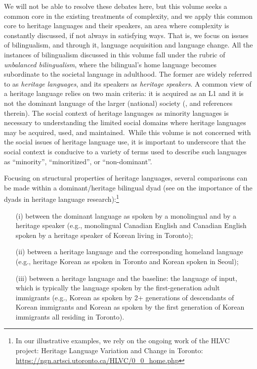 \documentclass[output=paper,colorlinks,citecolor=brown]{langscibook}
\begin{document}
We will not be able to resolve these debates here, but this volume seeks a common core in the existing treatments of complexity, and we apply this common core to heritage languages and their speakers, an area where complexity is constantly discussed, if not always in satisfying ways. That is, we focus on issues of bilingualism, and through it, language acquisition and language change. All the instances of bilingualism discussed in this volume fall under the rubric of \textit{unbalanced bilingualism}, where the bilingual’s home language becomes subordinate to the societal language in adulthood. The former are widely referred to as \textit{heritage languages}, and its speakers as \textit{heritage speakers}. A common view of a heritage language relies on two main criteria: it is acquired as an L1 and it is not the dominant language of the larger (national) society (\citealt{Rothman2009,Montrul2016,Polinsky2018,TsehayeEtAl2021}, and references therein). The social context of heritage languages as minority languages is necessary to understanding the limited social domains where heritage languages may be acquired, used, and maintained.~While this volume is not concerned with the social issues of heritage language use, it is important to underscore that the social context is conducive to a variety of terms used to describe such languages as “minority”, “minoritized”, or “non-dominant”.

Focusing on structural properties of heritage languages, several comparisons can be made within a dominant/heritage bilingual dyad (see \citealt{ScontrasPutnam2020} on the importance of the dyads in heritage language research):\footnote{ \textrm{In our illustrative examples, we rely on the ongoing work of the HLVC project: Heritage Language Variation and Change in Toronto: \url{https://ngn.artsci.utoronto.ca/HLVC/0_0_home.php}}}

\begin{enumerate}
  \item[(i)] between the dominant language as spoken by a monolingual and by a heritage speaker (e.g., monolingual Canadian English and Canadian English spoken by a heritage speaker of Korean living in Toronto);
  \item[(ii)] between a heritage language and the corresponding homeland language (e.g., heritage Korean as spoken in Toronto and Korean spoken in Seoul);
  \item[(iii)] between a heritage language and the baseline: the language of input, which is typically the language spoken by the first-generation adult immigrants (e.g., Korean as spoken by 2+ generations of descendants of Korean immigrants and Korean as spoken by the first generation of Korean immigrants all residing in Toronto).
\end{enumerate}
\end{document}
